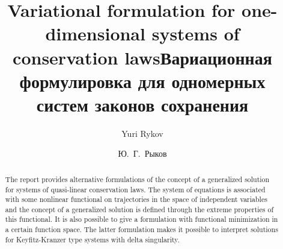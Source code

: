 \begin{englishtitle} %
\title{Variational formulation for one-dimensional systems of conservation laws}
\author{Yuri Rykov
} 
\maketitle

\begin{abstract}
The report provides alternative formulations of the concept of a
generalized solution for systems of quasi-linear conservation laws.
The system of equations is associated with some nonlinear
functional on trajectories in the space of independent variables
and the concept of a generalized solution is defined through the
extreme properties of this functional. It is also possible to give
a formulation with functional minimization in a certain function
space. The latter formulation makes it possible to interpret
solutions for Keyfitz-Kranzer type systems with delta singularity.

\end{abstract}
\end{englishtitle}


\iffalse
\documentclass[12pt]{llncs}


\usepackage{iftex}

\ifPDFTeX
\usepackage[T2A]{fontenc}
\usepackage[utf8]{inputenc} %
\usepackage[english,russian]{babel}
\fi

\usepackage{todonotes}

\usepackage[russian]{nla}


\fi
\title{Вариационная формулировка для одномерных систем законов сохранения
}
\author{Ю.~Г.~Рыков  %
} %

